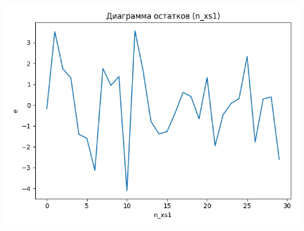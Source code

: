 \begin{figure}[H]
\begin{minipage}[H]{0.32\linewidth}
		\begin{center}
			\includegraphics[width=\linewidth]{figures/res_plot_n_xs1}
		\end{center}
	\end{minipage}
\end{figure}

